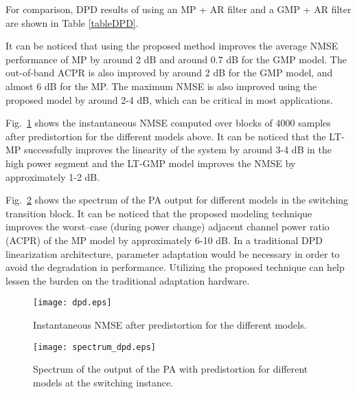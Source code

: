 \documentclass[journal]{IEEEtran}
\begin{document}
For comparison, DPD results of using an MP + AR filter and a GMP + AR filter are shown in Table \ref{tableDPD}.
\begin{table}
\caption{Comparison of DPD for the proposed modeling technique and MP and GMP. Model orders (in parenthesis) are chosen for relative similar complexity.} 
\end{table}
It can be noticed that using the proposed method improves the average NMSE performance of MP by around 2 dB and around 0.7 dB for the GMP model. The out-of-band ACPR is also improved by around 2 dB for the GMP model, and almost 6 dB for the MP. The maximum NMSE is also improved using the proposed model by around 2-4 dB, which can be critical in most applications.

Fig.~\ref{dpd} shows the instantaneous NMSE computed over blocks of 4000 samples after  predistortion for the different models above. It can be noticed that the LT-MP successfully improves the linearity of the system by around 3-4 dB in the high power segment and the LT-GMP model improves the NMSE by approximately 1-2 dB.

Fig.~\ref{spectrum_dpd} shows the spectrum of the PA output for different models in the switching transition block. It can be noticed that the proposed modeling technique improves the worst--case (during power change) adjacent channel power ratio (ACPR) of the MP model by approximately 6-10 dB. In a traditional DPD linearization architecture, parameter adaptation would be necessary in order to avoid the degradation in performance. Utilizing the proposed technique can help lessen the burden on the traditional adaptation hardware.
\begin{figure}
\centering
\texttt{[image: dpd.eps]}
\caption{Instantaneous NMSE after predistortion for the different models.} \label{dpd}
\end{figure}

\begin{figure}
\centering
\texttt{[image: spectrum\_dpd.eps]}
\caption{Spectrum of the output of the PA with predistortion for different models at the switching instance.} \label{spectrum_dpd}
\end{figure}
\end{document}
